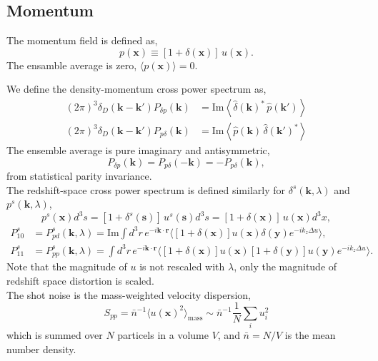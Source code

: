 \documentclass[a4paper,11pt, fleqn]{article}
\begin{document}
%
%
\vspace{5mm}
\subsection{Momentum}

The momentum field is defined as,
%
\begin{equation}
  p(\bm{x}) \equiv [1 + \delta(\bm{x})] \, u(\bm{x}).
\end{equation}
%
The ensamble average is zero, $\langle p(\bm{x}) \rangle = 0$.

We define the density-momentum cross power spectrum as,
\begin{align}
  (2\pi)^3 \delta_D(\bm{k} - \bm{k}') P_{\delta p}(\bm{k})
  &= \mathrm{Im} \left\langle
  \hat{\delta}(\bm{k})^* \, \hat{p}(\bm{k}')
  \right\rangle\\
%
  (2\pi)^3 \delta_D(\bm{k} - \bm{k}') P_{p \delta}(\bm{k})
  &= \mathrm{Im} \left\langle
  \hat{p}(\bm{k}) \, \hat{\delta}(\bm{k}')^*
  \right\rangle
\end{align}
The ensemble average is pure imaginary and antisymmetric,
%
\begin{equation}
  P_{\delta p}(\bm{k}) = P_{p \delta}(-\bm{k})
  = -P_{p \delta}(\bm{k}),
\end{equation}
from statistical parity invariance.\\

The redshift-space cross power spectrum is defined similarly for $\delta^s(\bm{k}, \lambda)$ and $p^s(\bm{k}, \lambda)$,
%
\begin{equation}
  p^s(\bm{x}) d^3 s = [1 + \delta^s(\bm{s})] \,u^s(\bm{s}) d^3 s
    = [1 + \delta(\bm{x}) ] \, u(\bm{x}) d^3 x,
\end{equation}
%
\begin{align}
  P^s_{10} &= P^s_{pd}(\bm{k}, \lambda) = \mathrm{Im}
  \int\! d^3 r \, e^{-i \bm{k}\cdot\bm{r}}
  \Big\langle
  [ 1 + \delta(\bm{x}) ] u(\bm{x}) \delta(\bm{y})
  e^{-i k_z \Delta u} \Big\rangle,\\
%
  P^s_{11} &= P^s_{pp}(\bm{k}, \lambda) = 
  \int\! d^3 r \, e^{-i \bm{k}\cdot\bm{r}}
  \Big\langle
  [ 1 + \delta(\bm{x}) ] u(\bm{x}) [ 1 + \delta(\bm{y}) ] u(\bm{y})
  e^{-i k_z \Delta u} \Big\rangle.  
\end{align}
%
Note that the magnitude of $u$ is not rescaled with $\lambda$, only the
magnitude of redshift space distortion is scaled.\\


The shot noise is the mass-weighted velocity dispersion,
\begin{equation}
  S_{pp} = \bar{n}^{-1} \langle u(\bm{x})^2 \rangle_\mathrm{mass}
        \sim \bar{n}^{-1} \frac{1}{N} \sum_i u_i^2
\end{equation}
which is summed over $N$ particels in a volume $V$, and
$\bar{n} = N/V$ is the mean number density.
\end{document}
